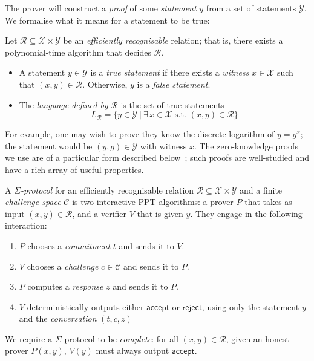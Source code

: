 \documentclass[12pt,a4paper]{article}
\theoremstyle{definition}
\begin{document}
The prover will construct a \textit{proof} of some \textit{statement} $y$ from a set of statements $\mathcal{Y}$. We formalise what it means for a statement to be true:
\begin{definition}
    Let $\mathcal{R}\subseteq\mathcal{X}\times\mathcal{Y}$ be an \textit{efficiently recognisable} relation; that is, there exists a polynomial-time algorithm that decides $\mathcal{R}$.
    \begin{itemize}
        \item A statement $y\in\mathcal{Y}$ is a \textit{true statement} if there exists a \textit{witness} $x\in\mathcal{X}$ such that $(x, y)\in\mathcal{R}$. Otherwise, $y$ is a \textit{false statement}.
        \item The \textit{language defined by} $\mathcal{R}$ is the set of true statements
        $$L_\mathcal{R}=\{y\in\mathcal{Y}\ |\ \exists\, x\in\mathcal{X}\text{ s.t. }(x,y)\in\mathcal{R}\}$$
    \end{itemize}
\end{definition}

For example, one may wish to prove they know the discrete logarithm of $y=g^x$; the statement would be $(y, g)\in\mathcal{Y}$ with witness $x$. The zero-knowledge proofs we use are of a particular form described below~\cite{cramer1996modular}; such proofs are well-studied and have a rich array of useful properties.
\begin{definition}
    A $\mathit{\Sigma}$\textit{-protocol} for an efficiently recognisable relation $\mathcal{R}\subseteq\mathcal{X}\times\mathcal{Y}$ and a finite \textit{challenge space} $\mathcal{C}$ is two interactive PPT algorithms: a prover $P$ that takes as input $(x, y)\in\mathcal{R}$, and a verifier $V$ that is given $y$. They engage in the following interaction:
    \begin{enumerate}
        \item $P$ chooses a \textit{commitment} $t$ and sends it to $V$.
        \item $V$ chooses a \textit{challenge} $c\in\mathcal{C}$ and sends it to $P$.
        \item $P$ computes a \textit{response} $z$ and sends it to $P$.
        \item $V$ deterministically outputs either $\mathsf{accept}$ or $\mathsf{reject}$, using only the statement $y$ and the \textit{conversation} $(t, c, z)$
    \end{enumerate}
    We require a $\Sigma$-protocol to be \textit{complete}: for all $(x, y)\in\mathcal{R}$, given an honest prover $P(x, y)$, $V(y)$ must always output $\mathsf{accept}$.
\end{definition}
\end{document}
